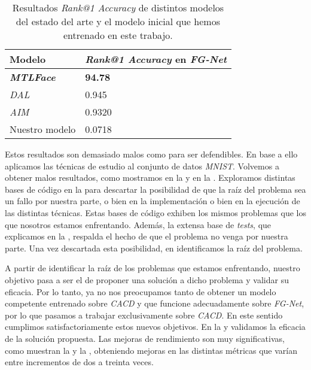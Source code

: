 \begin{table}[!hbtp]
\centering
\begin{tabular}{|l|l|}
    \hline
    Modelo                    & \textit{Rank@1 Accuracy} en \textit{FG-Net} \\
    \hline

    \textbf{\textit{MTLFace}} & \textbf{94.78}                              \\
    \textit{DAL}              & 0.945                                       \\
    \textit{AIM}              & 0.9320                                      \\
    Nuestro modelo            & 0.0718                                      \\
    \hline

\end{tabular}
\caption{Resultados \textit{Rank@1 Accuracy} de distintos modelos del estado del arte y el modelo inicial que hemos entrenado en este trabajo.}
\label{table:estado_del_arte_y_mi_modelo}
\end{table}

Estos resultados son demasiado malos como para ser defendibles. En base a ello aplicamos las técnicas de estudio al conjunto de datos \textit{MNIST}. Volvemos a obtener malos resultados, como mostramos en la  y en la . Exploramos distintas bases de código en la  para descartar la posibilidad de que la raíz del problema sea un fallo por nuestra parte, o bien en la implementación o bien en la ejecución de las distintas técnicas. Estas bases de código exhiben los mismos problemas que los que nosotros estamos enfrentando. Además, la extensa base de \textit{tests}, que explicamos en la , respalda el hecho de que el problema no venga por nuestra parte. Una vez descartada esta posibilidad, en  identificamos la raíz del problema.

A partir de identificar la raíz de los problemas que estamos enfrentando, nuestro objetivo pasa a ser el de proponer una solución a dicho problema y validar su eficacia. Por lo tanto, ya no nos preocupamos tanto de obtener un modelo competente entrenado sobre \textit{CACD} y que funcione adecuadamente sobre \textit{FG-Net}, por lo que pasamos a trabajar exclusivamente sobre \textit{CACD}. En este sentido cumplimos satisfactoriamente estos nuevos objetivos. En la  y  validamos la eficacia de la solución propuesta. Las mejoras de rendimiento son muy significativas, como muestran la  y la , obteniendo mejoras en las distintas métricas que varían entre incrementos de dos a treinta veces.
